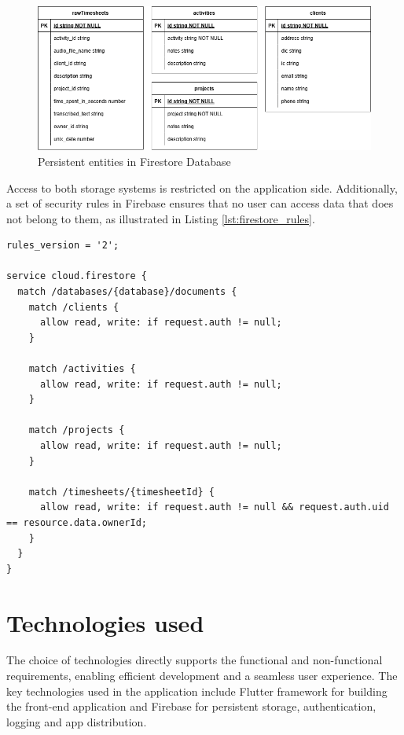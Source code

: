 \documentclass[
  digital,     %
  oneside,     %
  nosansbold,  %
  nocolorbold, %
  lof,         %
  lot,         %
]{fithesis4}
\begin{document}
\begin{figure}[!t]
    \centering
    \includegraphics[width=\textwidth]{assets/diagrams/entity-relationship-diagram.drawio.png}
    \caption{Persistent entities in Firestore Database}
    \label{fig:entity_diagram}
\end{figure}

Access to both storage systems is restricted on the application side. Additionally, a set of security rules in Firebase ensures that no user can access data that does not belong to them, as illustrated in Listing \ref{lst:firestore_rules}.

\newpage
\begin{lstlisting}[language=Firestore, caption={Firestore Security Rules}, label={lst:firestore_rules}, floatplacement=H, showstringspaces=false, showstringspaces=false]
rules_version = '2';

service cloud.firestore {
  match /databases/{database}/documents {
	match /clients {
      allow read, write: if request.auth != null;
    }
    
    match /activities {
      allow read, write: if request.auth != null;
    }
    
    match /projects {
      allow read, write: if request.auth != null;
    }

    match /timesheets/{timesheetId} {
      allow read, write: if request.auth != null && request.auth.uid == resource.data.ownerId;
    }
  }
}
\end{lstlisting}

\chapter{Technologies used}
The choice of technologies directly supports the functional and non-functional requirements, enabling efficient development and a seamless user experience. The key technologies used in the application include Flutter framework for building the front-end application and Firebase for persistent storage, authentication, logging and app distribution.
\end{document}
